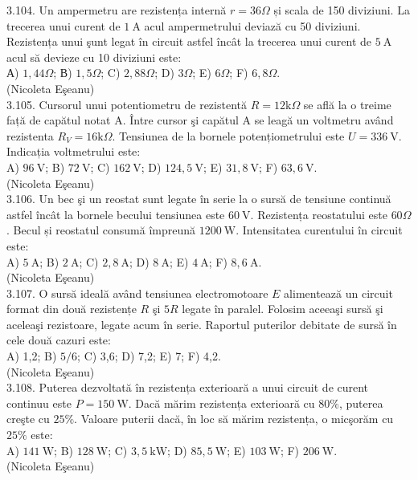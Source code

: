 \documentclass[10pt]{article}
\begin{document}
3.104. Un ampermetru are rezistența internă $r=36 \Omega$ și scala de 150 diviziuni. La trecerea unui curent de $1 \mathrm{~A}$ acul ampermetrului deviază cu 50 diviziuni. Rezistența unui şunt legat în circuit astfel încât la trecerea unui curent de $5 \mathrm{~A}$ acul să devieze cu 10 diviziuni este:\\ А) $1,44 \Omega$; В) $1,5 \Omega$; C) $2,88 \Omega$; D) $3 \Omega$; E) $6 \Omega$; F) $6,8 \Omega$.\\ (Nicoleta Eşeanu)\\

3.105. Cursorul unui potentiometru de rezistentă $R=12 \mathrm{k} \Omega$ se află la o treime față de capătul notat A. Între cursor şi capătul A se leagă un voltmetru având rezistenta $R_{V}=16 \mathrm{k} \Omega$. Tensiunea de la bornele potențiometrului este $U=336 \mathrm{~V}$. Indicația voltmetrului este:\\ A) $96 \mathrm{~V}$; B) $72 \mathrm{~V}$; C) $162 \mathrm{~V}$; D) $124,5 \mathrm{~V}$; E) $31,8 \mathrm{~V}$; F) $63,6 \mathrm{~V}$.\\ (Nicoleta Eşeanu)\\

3.106. Un bec şi un reostat sunt legate în serie la o sursă de tensiune continuă astfel încât la bornele becului tensiunea este $60 \mathrm{~V}$. Rezistența reostatului este $60 \Omega$. Becul și reostatul consumă împreună $1200 \mathrm{~W}$. Intensitatea curentului în circuit este:\\ A) $5 \mathrm{~A}$; B) $2 \mathrm{~A}$; C) $2,8 \mathrm{~A}$; D) $8 \mathrm{~A}$; E) $4 \mathrm{~A}$; F) $8,6 \mathrm{~A}$.\\ (Nicoleta Eşeanu)\\

3.107. O sursă ideală având tensiunea electromotoare $E$ alimentează un circuit format din două rezistențe $R$ şi $5 R$ legate în paralel. Folosim aceeaşi sursă şi aceleaşi rezistoare, legate acum în serie. Raportul puterilor debitate de sursă în cele două cazuri este:\\ A) 1,2; B) $5 / 6$; C) 3,6; D) 7,2; E) 7; F) 4,2.\\ (Nicoleta Eşeanu)\\

3.108. Puterea dezvoltată în rezistența exterioară a unui circuit de curent continuu este $P=150 \mathrm{~W}$. Dacă mărim rezistența exterioară cu $80 \%$, puterea creşte cu $25 \%$. Valoare puterii dacă, în loc să mărim rezistența, o micşorăm cu $25 \%$ este:\\ A) $141 \mathrm{~W}$; B) $128 \mathrm{~W}$; C) $3,5 \mathrm{~kW}$; D) $85,5 \mathrm{~W}$; E) $103 \mathrm{~W}$; F) $206 \mathrm{~W}$.\\ (Nicoleta Eşeanu)\\
\end{document}
